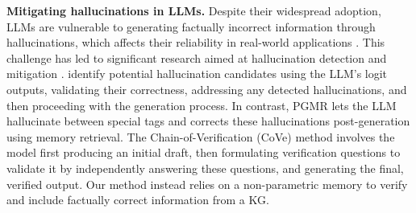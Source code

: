 \noindent \textbf{Mitigating hallucinations in LLMs.} Despite their widespread adoption, LLMs are vulnerable to generating factually incorrect information through hallucinations, which affects their reliability in real-world applications \citep{hallucination_survey_1, hallucination_survey_2, huang2021factual}. This challenge has led to significant research aimed at hallucination detection and mitigation \citep{lin2024towards, varshney2023stitch, dhuliawala2023chain, chern2023factool, li2023halueval}.
\citet{varshney2023stitch} identify potential hallucination candidates using the LLM’s logit outputs, validating their correctness, addressing any detected hallucinations, and then proceeding with the generation process.
In contrast, PGMR lets the LLM hallucinate between special tags and corrects these hallucinations post-generation using memory retrieval.
The Chain-of-Verification (CoVe) \citep{dhuliawala2023chain} method involves the model first producing an initial draft, then formulating verification questions to validate it by independently answering these questions, and generating the final, verified output.
Our method instead relies on a non-parametric memory to verify and include factually correct information from a KG.






